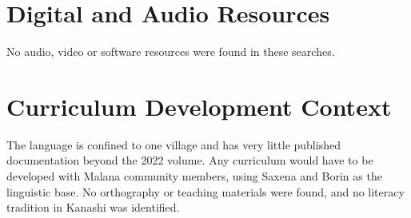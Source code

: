 \documentclass[12pt]{article}
\begin{document}
\section{Digital and Audio Resources}
No audio, video or software resources were found in these searches.

\section{Curriculum Development Context}
The language is confined to one village and has very little published documentation beyond the 2022 volume. Any curriculum would have to be developed with Malana community members, using Saxena and Borin as the linguistic base. No orthography or teaching materials were found, and no literacy tradition in Kanashi was identified.
\end{document}
